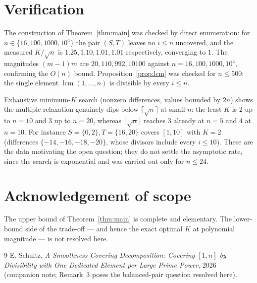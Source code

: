 \documentclass[11pt]{article}
\theoremstyle{definition}
\begin{document}
\section{Verification}\label{sec:verify}

The construction of Theorem~\ref{thm:main} was checked by direct enumeration: for
$n\in\{16,100,1000,10^4\}$ the pair $(S,T)$ leaves no $i\le n$ uncovered, and the measured
$K/\sqrt n$ is $1.25,1.10,1.01,1.01$ respectively, converging to $1$. The magnitudes
$(m-1)m$ are $20,110,992,10100$ against $n=16,100,1000,10^4$, confirming the $O(n)$ bound.
Proposition~\ref{prop:lcm} was checked for $n\le500$: the single element
$\operatorname{lcm}(1,\dots,n)$ is divisible by every $i\le n$.

Exhaustive minimum-$K$ search (nonzero differences, values bounded by $2n$) shows the
multiple-relaxation genuinely dips below $\lceil\sqrt n\rceil$ at small $n$: the least $K$
is $2$ up to $n=10$ and $3$ up to $n=20$, whereas $\lceil\sqrt n\rceil$ reaches $3$ already
at $n=5$ and $4$ at $n=10$. For instance $S=\{0,2\},T=\{16,20\}$ covers $[1,10]$ with $K=2$
(differences $\{-14,-16,-18,-20\}$, whose divisors include every $i\le10$). These are the
data motivating the open question; they do not settle the asymptotic rate, since the search
is exponential and was carried out only for $n\le24$.

\section*{Acknowledgement of scope}
The upper bound of Theorem~\ref{thm:main} is complete and elementary. The lower-bound side
of the trade-off --- and hence the exact optimal $K$ at polynomial magnitude --- is not
resolved here.

\begin{thebibliography}{9}
 E. Schultz, \emph{A Smoothness Covering Decomposition: Covering $[1,n]$
by Divisibility with One Dedicated Element per Large Prime Power}, 2026 (companion note;
Remark~3 poses the balanced-pair question resolved here).
\end{thebibliography}
\end{document}
